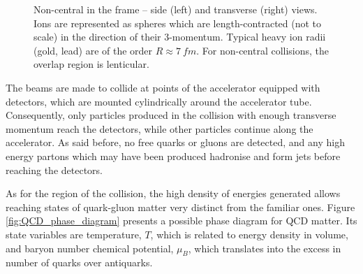 \begin{figure}
	\centering
	
	\caption{Non-central  in the  frame -- side (left) and transverse (right) views. Ions are represented as spheres which are length-contracted (not to scale) in the direction of their 3-momentum. Typical heavy ion radii (gold, lead) are of the order $R \approx \qty{7}{fm}$. For non-central collisions, the overlap region is lenticular.}
	\label{fig:HI_CM_coll}
\end{figure}



The beams are made to collide at points of the accelerator equipped with detectors, which are mounted cylindrically around the accelerator tube. Consequently, only particles produced in the collision with enough transverse momentum reach the detectors, while other particles continue along the accelerator. As said before, no free quarks or gluons are detected, and any high energy partons which may have been produced hadronise and form jets before reaching the detectors.


\medskip
As for the region of the collision, the high density of energies generated allows reaching states of quark-gluon matter very distinct from the familiar ones. Figure \ref{fig:QCD_phase_diagram} presents a possible phase diagram for \gls{QCD} matter. Its state variables are temperature, $T$, which is related to energy density in volume, and baryon number chemical potential, $\mu_B$, which translates into the excess in number of quarks over antiquarks. 

